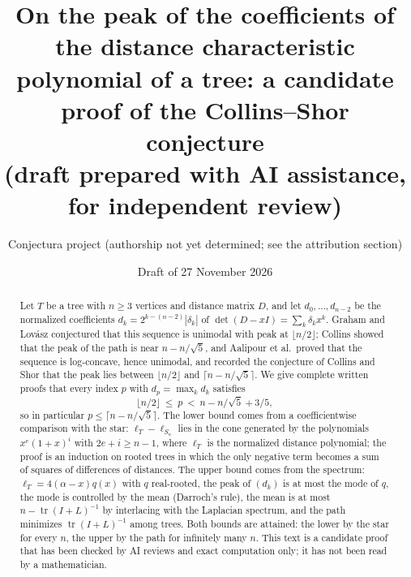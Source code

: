 \documentclass[11pt]{amsart}
\title[The peak of the distance characteristic polynomial of a tree]{On the
peak of the coefficients of the distance characteristic polynomial of a
tree: a candidate proof of the Collins--Shor conjecture\\[0.5ex]
\normalfont\small (draft prepared with AI assistance, for independent review)}
\author[Conjectura project (draft)]{Conjectura project (authorship not yet
determined; see the attribution section)}
\date{Draft of 27 November 2026}
\theoremstyle{definition}
\theoremstyle{remark}
\newcommand{\tr}{\operatorname{tr}}
\begin{document}
\begin{abstract}
Let $T$ be a tree with $n\ge3$ vertices and distance matrix $D$, and let
$d_0,\dots,d_{n-2}$ be the normalized coefficients
$d_k=2^{k-(n-2)}|\delta_k|$ of $\det(D-xI)=\sum_k\delta_kx^k$. Graham and
Lov\'asz conjectured that this sequence is unimodal with peak at
$\lfloor n/2\rfloor$;
Collins showed that the peak of the path is near $n-n/\sqrt5$, and Aalipour
et al.\ proved that the sequence is
log-concave, hence unimodal, and recorded the conjecture of Collins and Shor
that the peak lies between $\lfloor n/2\rfloor$ and $\lceil n-n/\sqrt5\rceil$.
We give complete written proofs that every index $p$ with $d_p=\max_kd_k$
satisfies
\[
\lfloor n/2\rfloor\ \le\ p\ <\ n-n/\sqrt5+3/5 ,
\]
so in particular $p\le\lceil n-n/\sqrt5\rceil$. The lower bound comes from a
coefficientwise comparison with the star: $\ell_T-\ell_{S_n}$ lies in the cone
generated by the polynomials $x^e(1+x)^i$ with $2e+i\ge n-1$, where $\ell_T$
is the normalized distance polynomial; the proof is an induction on rooted
trees in which the only negative term becomes a sum of squares of differences
of distances. The upper bound comes from the spectrum: $\ell_T=4(\alpha-x)q(x)$
with $q$ real-rooted, the peak of $(d_k)$ is at most the mode of $q$, the mode
is controlled by the mean (Darroch's rule), the mean is at most
$n-\tr(I+L)^{-1}$ by interlacing with the Laplacian spectrum, and the path
minimizes $\tr(I+L)^{-1}$ among trees. Both bounds are attained: the lower
by the star for every $n$, the upper by the path for infinitely many $n$.
This text is a candidate proof that has been checked by AI reviews and exact
computation only; it has not been read by a mathematician.
\end{abstract}

\maketitle

\begin{center}
\end{center}
\end{document}
